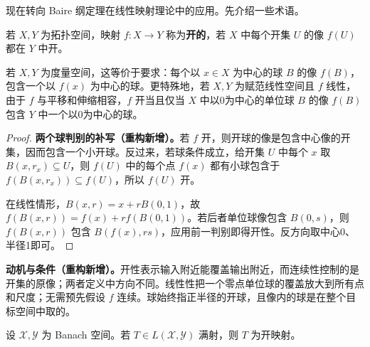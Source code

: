 \documentclass[../../main.tex]{subfiles}
\begin{document}
现在转向 Baire 纲定理在线性映射理论中的应用。先介绍一些术语。
\begin{definition}[开映射]\label{definition:ch05-open-map}
若 $X,Y$ 为拓扑空间，映射 $f:X\to Y$ 称为\textbf{开的}，若 $X$ 中每个开集 $U$ 的像 $f(U)$ 都在 $Y$ 中开。
\end{definition}
若 $X,Y$ 为度量空间，这等价于要求：每个以 $x\in X$ 为中心的球 $B$ 的像 $f(B)$，包含一个以 $f(x)$ 为中心的球。更特殊地，若 $X,Y$ 为赋范线性空间且 $f$ 线性，由于 $f$ 与平移和伸缩相容，$f$ 开当且仅当 $X$ 中以0为中心的单位球 $B$ 的像 $f(B)$ 包含 $Y$ 中一个以0为中心的球。
\begin{proof}
\textbf{两个球判别的补写（重构新增）。}若 $f$ 开，则开球的像是包含中心像的开集，因而包含一个小开球。反过来，若球条件成立，给开集 $U$ 中每个 $x$ 取 $B(x,r_x)\subseteq U$，则 $f(U)$ 中的每个点 $f(x)$ 都有小球包含于 $f(B(x,r_x))\subseteq f(U)$，所以 $f(U)$ 开。

在线性情形，$B(x,r)=x+rB(0,1)$，故 $f(B(x,r))=f(x)+rf(B(0,1))$。若后者单位球像包含 $B(0,s)$，则 $f(B(x,r))$ 包含 $B(f(x),rs)$，应用前一判别即得开性。反方向取中心0、半径1即可。
\end{proof}
\begin{remark}
\textbf{动机与条件（重构新增）。}开性表示输入附近能覆盖输出附近，而连续性控制的是开集的原像；两者定义中方向不同。线性性把一个零点单位球的覆盖放大到所有点和尺度；无需预先假设 $f$ 连续。球始终指正半径的开球，且像内的球是在整个目标空间中取的。
\end{remark}
\begin{theorem}[开映射定理]\label{theorem:ch05-open-mapping}
设 $\mathcal X,\mathcal Y$ 为 Banach 空间。若 $T\in L(\mathcal X,\mathcal Y)$ 满射，则 $T$ 为开映射。
\end{theorem}
\end{document}
